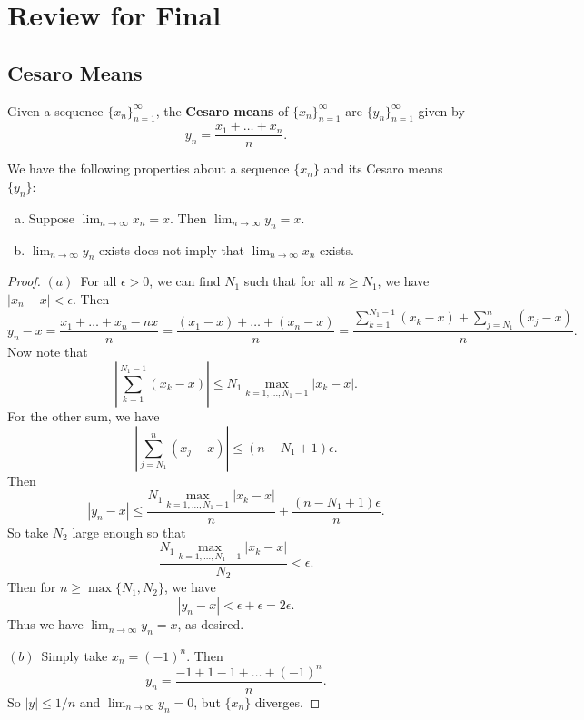 \section{Review for Final}

\subsection{Cesaro Means}
\begin{definition}
  Given a sequence $\{x_n\}_{n = 1}^\infty$, the
  \textbf{Cesaro means} of $\{x_n\}_{n = 1}^\infty$ are
  $\{y_n\}_{n = 1}^\infty$ given by
  \[
    y_n = \frac{x_1 + \dots + x_n}{n}.
  \]
\end{definition}

\begin{prop}
  We have the following properties about a sequence
  $\{x_n\}$ and
  its Cesaro means $\{y_n\}$:
  \begin{enumerate}[(a)]
    \item Suppose $\lim_{n \to \infty} x_n = x$. Then
      $\lim_{n \to \infty} y_n = x$.
    \item $\lim_{n \to \infty} y_n$ exists does not
      imply that $\lim_{n \to \infty} x_n$ exists.
  \end{enumerate}
\end{prop}

\begin{proof}
  $(a)$\, For all $\epsilon > 0$, we can find $N_1$ such that
  for all $n \ge N_1$, we have
  $|x_n - x| < \epsilon$. Then
  \[
    y_n - x = \frac{x_1 + \dots + x_n - nx}{n}
    = \frac{(x_1 - x) + \dots + (x_n - x)}{n}
    = \frac{\sum_{k = 1}^{N_1 - 1} (x_k - x)
    + \sum_{j = N_1}^{n} (x_j - x)}{n}.
  \]
  Now note that
  \[
    \left|\sum_{k = 1}^{N_1 - 1} (x_k - x)\right|
    \le N_1 \max_{k = 1, \dots, N_1 - 1} |x_k - x|.
  \]
  For the other sum, we have
  \[
    \left|\sum_{j = N_1}^n (x_j - x)\right|
    \le (n - N_1 + 1)\epsilon.
  \]
  Then
  \[
  |y_n - x| \le \frac{N_1 \max_{k = 1, \dots, N_1 - 1} |x_k - x|}{n} + \frac{(n - N_1 + 1)\epsilon}{n}.
  \]
  So take $N_2$ large enough so that
  \[
    \frac{N_1 \max_{k = 1, \dots, N_1 - 1} |x_k - x|}{N_2} < \epsilon.
  \]
  Then for $n \ge \max\{N_1, N_2\}$, we have
  \[
    |y_n - x| < \epsilon + \epsilon = 2\epsilon.
  \]
  Thus we have $\lim_{n \to \infty} y_n = x$, as desired.

  $(b)$\, Simply take $x_n = (-1)^n$. Then
  \[
    y_n = \frac{-1 + 1 - 1 + \dots + (-1)^n}{n}.
  \]
  So $|y| \le 1 / n$ and
  $\lim_{n \to \infty} y_n = 0$, but $\{x_n\}$ diverges.
\end{proof}

